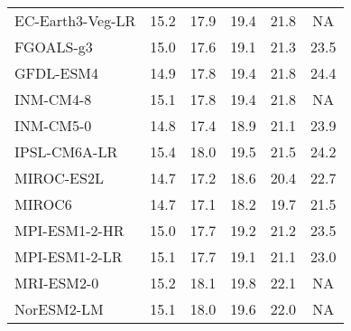 \begin{table}
\begin{tabular}{lccccc}
    EC-Earth3-Veg-LR   & 15.2                         & 17.9                         & 19.4                         & 21.8                         & NA                           \\
    FGOALS-g3          & 15.0                         & 17.6                         & 19.1                         & 21.3                         & 23.5                         \\
    GFDL-ESM4          & 14.9                         & 17.8                         & 19.4                         & 21.8                         & 24.4                         \\
    INM-CM4-8          & 15.1                         & 17.8                         & 19.4                         & 21.8                         & NA                           \\
    INM-CM5-0          & 14.8                         & 17.4                         & 18.9                         & 21.1                         & 23.9                         \\
    IPSL-CM6A-LR       & 15.4                         & 18.0                         & 19.5                         & 21.5                         & 24.2                         \\
    MIROC-ES2L         & 14.7                         & 17.2                         & 18.6                         & 20.4                         & 22.7                         \\
    MIROC6             & 14.7                         & 17.1                         & 18.2                         & 19.7                         & 21.5                         \\
    MPI-ESM1-2-HR      & 15.0                         & 17.7                         & 19.2                         & 21.2                         & 23.5                         \\
    MPI-ESM1-2-LR      & 15.1                         & 17.7                         & 19.1                         & 21.1                         & 23.0                         \\
    MRI-ESM2-0         & 15.2                         & 18.1                         & 19.8                         & 22.1                         & NA                           \\
    NorESM2-LM         & 15.1                         & 18.0                         & 19.6                         & 22.0                         & NA                           \\

\end{tabular}
\end{table}
